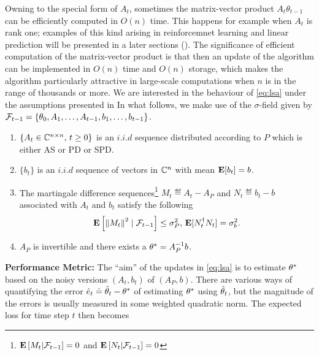 Owning to the special form of $A_t$, sometimes the matrix-vector product $A_t \theta_{t-1}$
can be efficiently computed in $O(n)$ time.
This happens for example when $A_t$ is rank one; examples of this kind arising in reinforcemnet learning \cite{} and linear prediction \cite{} will be presented in a later sections (). The significance of efficient computation of the matrix-vector product is that then an update of the algorithm
can be implemented in $O(n)$ time and $O(n)$ storage, which makes the algorithm particularly attractive in large-scale computations when $n$ is in the range of thousands or more.
We are interested in the behaviour of \eqref{eq:lsa} under the assumptions presented in  In what follows, we make use of the $\sigma$-field given by $\mathcal{F}_{t-1}=\{\theta_0,A_1,\ldots, A_{t-1}, b_1,\ldots, b_{t-1}\}$.
\begin{assumption}\label{assmp:lsa}
\begin{enumerate}[leftmargin=*, before = \leavevmode\vspace{-\baselineskip}]
\item \label{dist} $\{A_t\in\mathbb{C}^{n\times n},\, t\geq 0\}$ is an $i.i.d$ sequence distributed according to $P$ which is either AS or PD or SPD.
\item $\{b_t\}$ is an $i.i.d$ sequence of vectors in $\mathbb{C}^n$ with mean $\mathbf{E}[b_t]=b$.
\item \label{matvar} The martingale difference sequences\footnote{$\mathbf{E}\left[M_t|\mathcal{F}_{t-1}\right]=0$ and $\mathbf{E}\left[N_t|\mathcal{F}_{t-1}\right]=0$} $M_t\eqdef A_t-A_P$ and $N_t\eqdef b_t-b$ associated with $A_t$ and $b_t$ satisfy the following
\begin{align*}\mathbf{E}\left[ \left\| M_t\right\|^2\mid\mathcal{F}_{t-1}\right]\leq \sigma^2_P, \, \mathbf{E}[N_t^\dag N_t]=\sigma_b^2.\end{align*}
\item $A_P$ is invertible and there exists a $\theta^*=A_P^{-1}b$.
\end{enumerate}
\end{assumption}
\textbf{Performance Metric:}
The ``aim'' of the updates in \eqref{eq:lsa} is to estimate $\theta^*$ based on the noisy versions $(A_t,b_t)$ of $(A_P,b)$.
There are various ways of quantifying the error $\hat{e}_t \doteq \hat{\theta}_t- \theta^*$ of estimating $\theta^*$ using $\hat{\theta}_t$, but the magnitude
of the errors is usually measured in some weighted quadratic norm. The expected loss for time step $t$ then becomes
